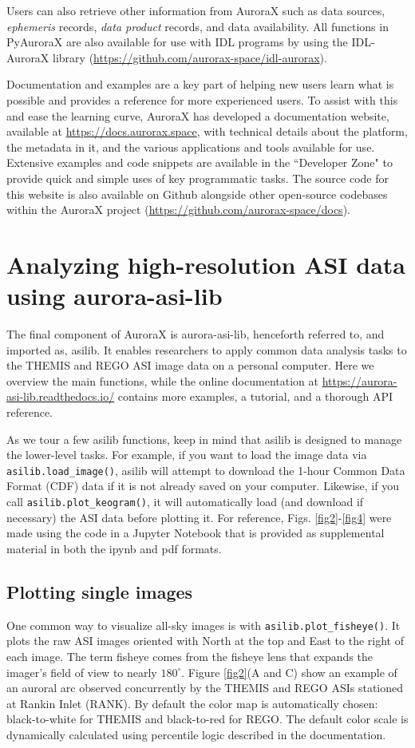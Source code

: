 \documentclass[utf8]{FrontiersinHarvard} %
\begin{document}
Users can also retrieve other information from AuroraX such as data sources, \textit{ephemeris} records, \textit{data product} records, and data availability. All functions in PyAuroraX are also available for use with IDL programs by using the IDL-AuroraX library (\url{https://github.com/aurorax-space/idl-aurorax}). 

Documentation and examples are a key part of helping new users learn what is possible and provides a reference for more experienced users. To assist with this and ease the learning curve, AuroraX has developed a documentation website, available at \url{https://docs.aurorax.space}, with technical details about the platform, the metadata in it, and the various applications and tools available for use. Extensive examples and code snippets are available in the ``Developer Zone" to provide quick and simple uses of key programmatic tasks. The source code for this website is also available on Github alongside other open-source codebases within the AuroraX project (\url{https://github.com/aurorax-space/docs}). 

\section{Analyzing high-resolution ASI data using aurora-asi-lib}\label{aurora-asi-lib}
The final component of AuroraX is aurora-asi-lib, henceforth referred to, and imported as, asilib. It enables researchers to apply common data analysis tasks to the THEMIS and REGO ASI image data on a personal computer. Here we overview the main functions, while the online documentation at \url{https://aurora-asi-lib.readthedocs.io/} contains more examples, a tutorial, and a thorough API reference.

As we tour a few asilib functions, keep in mind that asilib is designed to manage the lower-level tasks. For example, if you want to load the image data via \verb|asilib.load_image()|, asilib will attempt to download the 1-hour Common Data Format (CDF) data if it is not already saved on your computer. Likewise, if you call \verb|asilib.plot_keogram()|, it will automatically load (and download if necessary) the ASI data before plotting it. For reference, Figs. \ref{fig2}-\ref{fig4} were made using the code in a Jupyter Notebook that is provided as supplemental material in both the ipynb and pdf formats.

\subsection{Plotting single images}
One common way to visualize all-sky images is with \verb|asilib.plot_fisheye()|. It plots the raw ASI images oriented with North at the top and East to the right of each image. The term fisheye comes from the fisheye lens that expands the imager's field of view to nearly $180^\circ$. Figure \ref{fig2}(A and C) show an example of an auroral arc observed concurrently by the THEMIS and REGO ASIs stationed at Rankin Inlet (RANK). By default the color map is automatically chosen: black-to-white for THEMIS and black-to-red for REGO. The default color scale is dynamically calculated using percentile logic described in the documentation.
\end{document}
